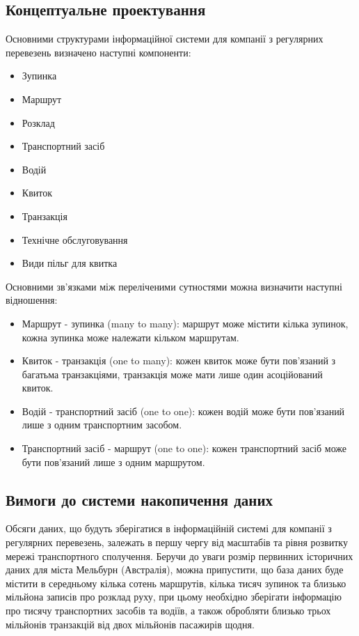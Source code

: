 \documentclass[oneside,14pt]{extarticle}
\begin{document}
\subsection{Концептуальне проектування}
Основними структурами інформаційної системи для компанії з регулярних перевезень визначено наступні компоненти:
\begin{itemize}
\item Зупинка
\item Маршрут
\item Розклад
\item Транспортний засіб
\item Водій
\item Квиток
\item Транзакція
\item Технічне обслуговування
\item Види пільг для квитка
\end{itemize}

Основними зв'язками між переліченими сутностями можна визначити наступні відношення:
\begin{itemize}
\item Маршрут - зупинка (many to many): маршрут може містити кілька зупинок, кожна зупинка може належати кільком маршрутам.
\item Квиток - транзакція (one to many): кожен квиток може бути пов'язаний з багатьма транзакціями, транзакція може мати лише один асоційований квиток.
\item Водій - транспортний засіб (one to one): кожен водій може бути пов'язаний лише з одним транспортним засобом.
\item Транспортний засіб - маршрут (one to one): кожен транспортний засіб може бути пов'язаний лише з одним маршрутом.
\end{itemize}

\subsection{Вимоги до системи накопичення даних}
Обсяги даних, що будуть зберігатися в інформаційній системі для компанії з регулярних перевезень, залежать в першу чергу від масштабів та рівня розвитку мережі транспортного сполучення. Беручи до уваги розмір первинних історичних даних для міста Мельбурн (Австралія), можна припустити, що база даних буде містити в середньому кілька сотень маршрутів, кілька тисяч зупинок та близько мільйона записів про розклад руху, при цьому необхідно зберігати інформацію про тисячу транспортних засобів та водіїв, а також обробляти близько трьох мільйонів транзакцій від двох мільйонів пасажирів щодня.
\end{document}
